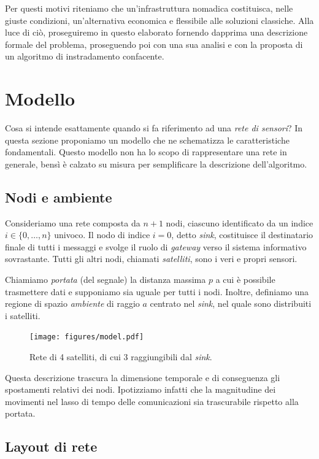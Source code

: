 \documentclass[a4paper,12pt]{article}
\theoremstyle{definition}
\begin{document}
Per questi motivi riteniamo che un'infrastruttura nomadica costituisca, nelle giuste condizioni, un'alternativa economica e flessibile alle soluzioni classiche. Alla luce di ciò, proseguiremo in questo elaborato fornendo dapprima una descrizione formale del problema, proseguendo poi con una sua analisi e con la proposta di un algoritmo di instradamento confacente.

\section{Modello}

Cosa si intende esattamente quando si fa riferimento ad una \emph{rete di sensori}? In questa sezione proponiamo un modello che ne schematizza le caratteristiche fondamentali. Questo modello non ha lo scopo di rappresentare una rete in generale, bensì è calzato su misura per semplificare la descrizione dell'algoritmo.

\subsection{Nodi e ambiente}


Consideriamo una rete composta da $n+1$ nodi, ciascuno identificato da un indice $i \in \{0, \dots, n\}$ univoco. Il nodo di indice $i=0$, detto \emph{sink}, costituisce il destinatario finale di tutti i messaggi e svolge il ruolo di \emph{gateway} verso il sistema informativo sovrastante. Tutti gli altri nodi, chiamati \emph{satelliti}, sono i veri e propri sensori.

Chiamiamo \emph{portata} (del segnale) la distanza massima $p$ a cui è possibile trasmettere dati e supponiamo sia uguale per tutti i nodi. Inoltre, definiamo una regione di spazio \emph{ambiente} di raggio $a$ centrato nel \emph{sink}, nel quale sono distribuiti i satelliti.

\begin{figure}[H]
\centering
\texttt{[image: figures/model.pdf]}
\caption{Rete di 4 satelliti, di cui 3 raggiungibili dal \emph{sink}.}
\end{figure}

Questa descrizione trascura la dimensione temporale e di conseguenza gli spostamenti relativi dei nodi. Ipotizziamo infatti che la magnitudine dei movimenti nel lasso di tempo delle comunicazioni sia trascurabile rispetto alla portata.

\subsection{Layout di rete}
\end{document}
